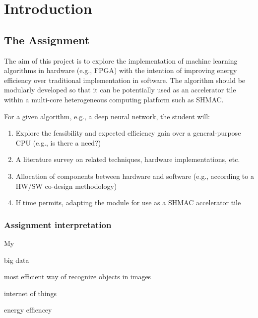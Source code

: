 \chapter{Introduction}


\section{The Assignment}
The aim of this project is to explore the implementation of machine learning algorithms in hardware (e.g., FPGA) with the intention of improving energy efficiency over traditional implementation in software. The algorithm should be modularly developed so that it can be potentially used as an accelerator tile within a multi-core heterogeneous computing platform such as SHMAC.

For a given algorithm, e.g., a deep neural network, the student will:

\begin{enumerate}
	
	\item Explore the feasibility and expected efficiency gain over a general-purpose CPU (e.g., is there a need?)
	
	\item A literature survey on related techniques, hardware implementations, etc.
	
	\item Allocation of components between hardware and software (e.g., according to a HW/SW co-design methodology)
	
	\item If time permits, adapting the module for use as a SHMAC accelerator tile
	
\end{enumerate}

\subsection{Assignment interpretation}

My 

big data

most efficient way of recognize objects in images

internet of things

energy effiencey